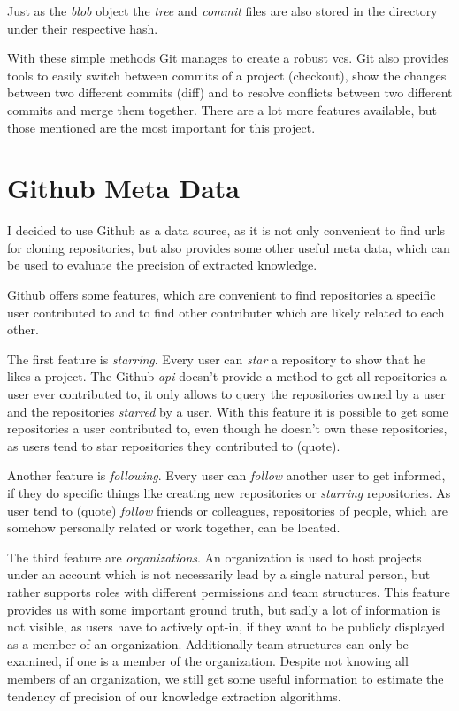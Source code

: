 Just as the \emph{blob} object the \emph{tree} and \emph{commit} files are also stored in the  directory under their respective hash.

With these simple methods Git manages to create a robust \ac{vcs}.
Git also provides tools to easily switch between commits of a project (checkout), show the changes between two different commits (diff) and to resolve conflicts between two different commits and merge them together.
There are a lot more features available, but those mentioned are the most important for this project.

\section{Github Meta Data}\label{github-meta-data}

I decided to use Github as a data source, as it is not only convenient to find \acp{url} for cloning repositories, but also provides some other useful meta data, which can be used to evaluate the precision of extracted knowledge.

Github offers some features, which are convenient to find repositories a specific user contributed to and to find other contributer which are likely related to each other.

The first feature is \emph{starring}. Every user can \emph{star} a repository to show that he likes a project.
The Github \emph{api} doesn't provide a method to get all repositories a user ever contributed to, it only allows to query the repositories owned by a user and the repositories \emph{starred} by a user.
With this feature it is possible to get some repositories a user contributed to, even though he doesn't own these repositories, as users tend to star repositories they contributed to (quote).

Another feature is \emph{following}. Every user can \emph{follow} another user to get informed, if they do specific things like creating new repositories or \emph{starring} repositories.
As user tend to (quote) \emph{follow} friends or colleagues, repositories of people, which are somehow personally related or work together, can be located.

The third feature are \emph{organizations}.
An organization is used to host projects under an account which is not necessarily lead by a single natural person, but rather supports roles with different permissions and team structures.
This feature provides us with some important ground truth, but sadly a lot of information is not visible, as users have to actively opt-in, if they want to be publicly displayed as a member of an organization.
Additionally team structures can only be examined, if one is a member of the organization.
Despite not knowing all members of an organization, we still get some useful information to estimate the tendency of precision of our knowledge extraction algorithms.


